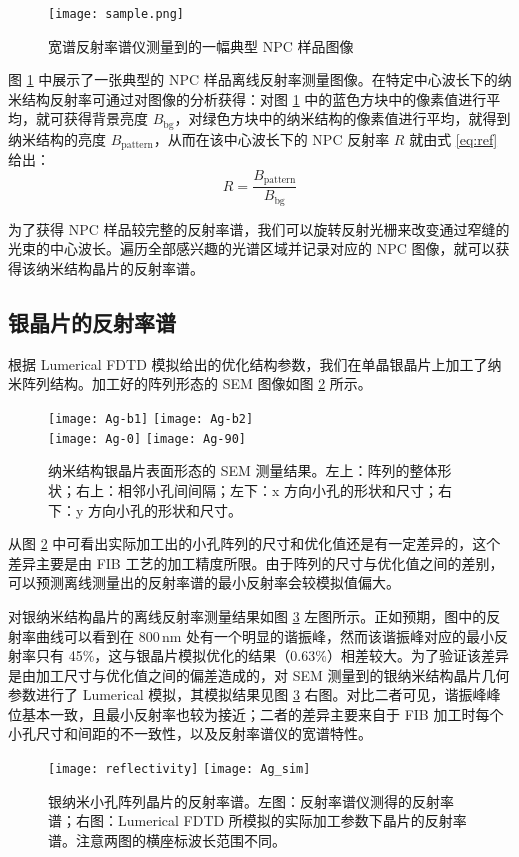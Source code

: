 \begin{figure}[htbp]
\centering
\texttt{[image: sample.png]}
\caption{\label{fig:sample} 宽谱反射率谱仪测量到的一幅典型 NPC 样品图像}
\end{figure}

图 \ref{fig:sample} 中展示了一张典型的 NPC 样品离线反射率测量图像。在特定中心波长下的纳米结构反射率可通过对图像的分析获得：对图 \ref{fig:sample} 中的蓝色方块中的像素值进行平均，就可获得背景亮度 $B_{\text{bg}}$，对绿色方块中的纳米结构的像素值进行平均，就得到纳米结构的亮度 $B_{\text{pattern}}$，从而在该中心波长下的 NPC 反射率 $R$ 就由式 \ref{eq:ref} 给出：
\begin{equation}
\label{eq:ref}
R = \frac{B_{\text{pattern}}}{B_{\text{bg}}}
\end{equation}

为了获得 NPC 样品较完整的反射率谱，我们可以旋转反射光栅来改变通过窄缝的光束的中心波长。遍历全部感兴趣的光谱区域并记录对应的 NPC 图像，就可以获得该纳米结构晶片的反射率谱。

\subsection{银晶片的反射率谱}
根据 Lumerical FDTD 模拟给出的优化结构参数，我们在单晶银晶片上加工了纳米阵列结构。加工好的阵列形态的 SEM 图像如图 \ref{fig:Ag_b_sem} 所示。
\begin{figure}[htbp]
\begin{center}
\texttt{[image: Ag-b1]}
\texttt{[image: Ag-b2]}
\\[2pt]
\texttt{[image: Ag-0]}
\texttt{[image: Ag-90]}
\caption{\label{fig:Ag_b_sem} 
纳米结构银晶片表面形态的 SEM 测量结果。左上：阵列的整体形状；右上：相邻小孔间间隔；左下：x 方向小孔的形状和尺寸；右下：y 方向小孔的形状和尺寸。}
\end{center}
\end{figure}
从图 \ref{fig:Ag_b_sem} 中可看出实际加工出的小孔阵列的尺寸和优化值还是有一定差异的，这个差异主要是由 FIB 工艺的加工精度所限。由于阵列的尺寸与优化值之间的差别，可以预测离线测量出的反射率谱的最小反射率会较模拟值偏大。

对银纳米结构晶片的离线反射率测量结果如图 \ref{fig:Ag-b} 左图所示。正如预期，图中的反射率曲线可以看到在 800\,nm 处有一个明显的谐振峰，然而该谐振峰对应的最小反射率只有 45\%，这与银晶片模拟优化的结果（0.63\%）相差较大。为了验证该差异是由加工尺寸与优化值之间的偏差造成的，对 SEM 测量到的银纳米结构晶片几何参数进行了 Lumerical 模拟，其模拟结果见图 \ref{fig:Ag-b} 右图。对比二者可见，谐振峰峰位基本一致，且最小反射率也较为接近；二者的差异主要来自于 FIB 加工时每个小孔尺寸和间距的不一致性，以及反射率谱仪的宽谱特性。
\begin{figure}[htbp]
\begin{center}
\texttt{[image: reflectivity]}
\texttt{[image: Ag\_sim]}
\caption{\label{fig:Ag-b}
银纳米小孔阵列晶片的反射率谱。左图：反射率谱仪测得的反射率谱；右图：Lumerical FDTD 所模拟的实际加工参数下晶片的反射率谱。注意两图的横座标波长范围不同。}
\end{center}
\end{figure}

